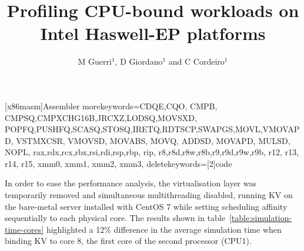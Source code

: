 \documentclass[a4paper]{jpconf}
\begin{document}
\title{Profiling CPU-bound workloads on Intel Haswell-EP platforms}

\author{M Guerri$^1$, D Giordano$^1$ and C Cordeiro$^1$}
\address{$^1$ CERN}


   [x86masm]{Assembler}
   {morekeywords={CDQE,CQO, CMPB, CMPSQ,CMPXCHG16B,JRCXZ,LODSQ,MOVSXD,
                  POPFQ,PUSHFQ,SCASQ,STOSQ,IRETQ,RDTSCP,SWAPGS,MOVL,VMOVAPD,
                  VSTMXCSR, VMOVSD, MOVABS, MOVQ, ADDSD, MOVAPD, MULSD, NOPL,
                  rax,rdx,rcx,rbx,rsi,rdi,rsp,rbp, rip,
                  r8,r8d,r8w,r8b,r9,r9d,r9w,r9b, r12, r13, r14, r15,
                  xmm0, xmm1, xmm2, xmm3},
    deletekeywords=[2]{code}
    }
\newcommand\realnumberstyle[1]{}

\makeatletter
\newcommand{\zebra}[3]{%
    {\realnumberstyle{#3}}%
    \begingroup
    \lst@basicstyle
    \ifodd\value{lstnumber}%
        \color{#1}%
    \else
        \color{#2}%
    \fi
        \rlap{\hspace*{\lst@numbersep}%
        \color@block{\linewidth}{\ht\strutbox}{\dp\strutbox}%
        }%
    \endgroup
}
\makeatother




In order to ease the performance analysis, the virtualisation layer was
temporarily removed and simultaneous multithreading disabled, running KV on
the bare-metal server installed with CentOS 7 while setting scheduling affinity sequentially to each physical
core. The results shown in table~\ref{table:simulation-time-cores}
highlighted a 12\% difference in the average simulation
time when binding KV to core 8, the first core of the second processor (CPU1).
\end{document}
